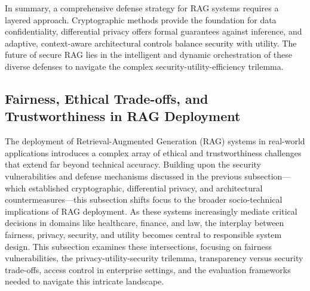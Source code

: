 \documentclass[11pt]{article}
\begin{document}
In summary, a comprehensive defense strategy for RAG systems requires a layered approach. Cryptographic methods provide the foundation for data confidentiality, differential privacy offers formal guarantees against inference, and adaptive, context-aware architectural controls balance security with utility. The future of secure RAG lies in the intelligent and dynamic orchestration of these diverse defenses to navigate the complex security-utility-efficiency trilemma.

\subsection{Fairness, Ethical Trade-offs, and Trustworthiness in RAG Deployment}

The deployment of Retrieval-Augmented Generation (RAG) systems in real-world applications introduces a complex array of ethical and trustworthiness challenges that extend far beyond technical accuracy. Building upon the security vulnerabilities and defense mechanisms discussed in the previous subsection---which established cryptographic, differential privacy, and architectural countermeasures---this subsection shifts focus to the broader socio-technical implications of RAG deployment. As these systems increasingly mediate critical decisions in domains like healthcare, finance, and law, the interplay between fairness, privacy, security, and utility becomes central to responsible system design. This subsection examines these intersections, focusing on fairness vulnerabilities, the privacy-utility-security trilemma, transparency versus security trade-offs, access control in enterprise settings, and the evaluation frameworks needed to navigate this intricate landscape.
\end{document}
